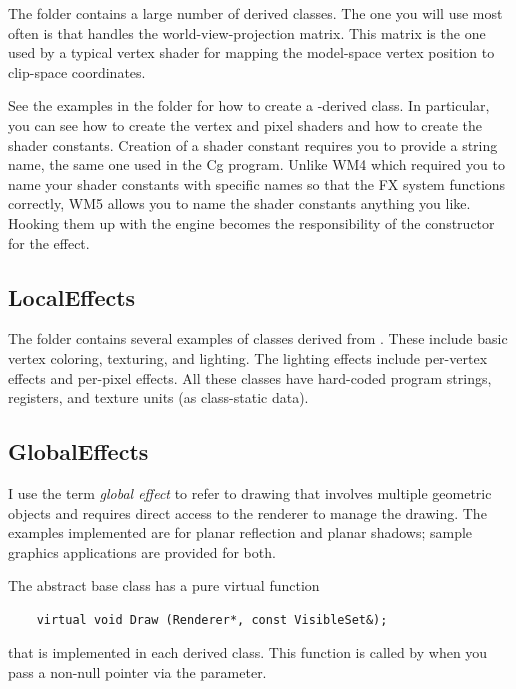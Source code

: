 \documentclass{article}
\begin{document}
The  folder contains a large number of derived classes.
The one you will use most often is  that handles
the world-view-projection matrix.  This matrix is the one used by a
typical vertex shader for mapping the model-space vertex position
to clip-space coordinates.

See the examples in the  folder for how to create a
-derived class.  In particular, you can see how to
create the vertex and pixel shaders and how to create the shader constants.
Creation of a shader constant requires you to provide a string name, the
same one used in the Cg program.  Unlike WM4 which required you to name
your shader constants with specific names so that the FX system functions
correctly, WM5 allows you to name the shader constants anything you like.
Hooking them up with the engine becomes the responsibility of the constructor
for the effect.

\subsection{LocalEffects}

The  folder contains several examples of
classes derived from .  These include basic vertex
coloring, texturing, and lighting.  The lighting effects include per-vertex
effects and per-pixel effects.  All these classes have hard-coded program
strings, registers, and texture units (as class-static data).

\subsection{GlobalEffects}

I use the term {\em global effect} to refer to drawing that involves
multiple geometric objects and requires direct access to the renderer
to manage the drawing.  The examples implemented are for planar reflection
and planar shadows; sample graphics applications are provided for both.

The abstract base class  has a pure virtual function
\begin{verbatim}
    virtual void Draw (Renderer*, const VisibleSet&);
\end{verbatim}
that is implemented in each derived class.  This function is called
by  when you pass
a non-null pointer via the  parameter.
\end{document}
